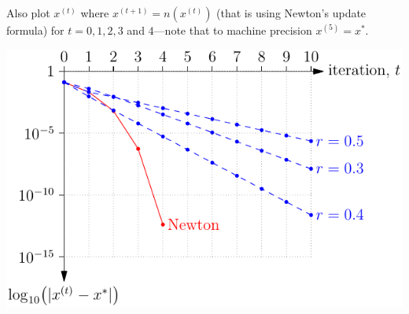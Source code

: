 \documentclass{sotonExamBoxes}    %
\begin{document}
\begin{question}{15}
\begin{qparts}
{      Also plot $x^{(t)}$ where $x^{(t+1)} = n(x^{(t)})$ (that is
      using Newton's update formula) for $t=0, 1, 2, 3$ and
      $4$---note that to machine precision $x^{(5)}=x^*$.
    }{}
    \begin{answer}
      \begin{center}
        \includegraphics[width=0.9\linewidth]{convergence_a}
      \end{center}
    \end{answer}
  \end{qparts}
\end{question}
\freshpage
\end{document}
